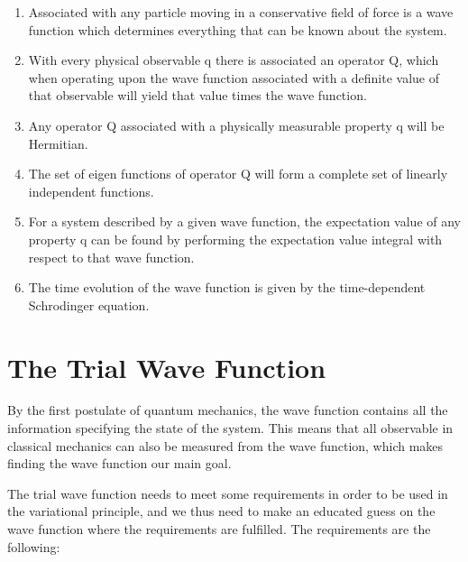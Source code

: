 \begin{enumerate}
\item Associated with any particle moving in a conservative field of force is a wave function which determines everything that can be known about the system.

\item With every physical observable q there is associated an operator Q, which when operating upon the wave function associated with a definite value of that observable will yield that value times the wave function.

\item Any operator Q associated with a physically measurable property q will be Hermitian.

\item The set of eigen functions of operator Q will form a complete set of linearly independent functions.

\item For a system described by a given wave function, the expectation value of any property q can be found by performing the expectation value integral with respect to that wave function.

\item The time evolution of the wave function is given by the time-dependent Schrodinger equation. 
\end{enumerate}

\section{The Trial Wave Function} \label{subsec:wavefunction}
By the first postulate of quantum mechanics, the wave function contains all the information specifying the state of the system. This means that all observable in classical mechanics can also be measured from the wave function, which makes finding the wave function our main goal.

The trial wave function needs to meet some requirements in order to be used in the variational principle, and we thus need to make an educated guess on the wave function where the requirements are fulfilled. The requirements are the following:

